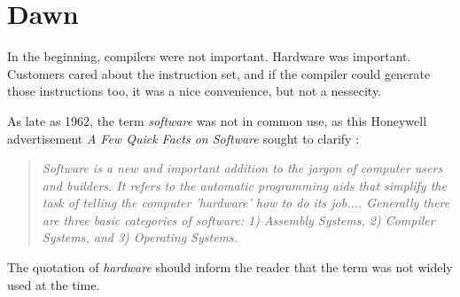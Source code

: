 \chapter{Dawn}

In the beginning, compilers were not important.
Hardware was important.
Customers cared about the instruction set,
and if the compiler could generate those instructions too,
it was a nice convenience, but not a nessecity.

As late as 1962, the term \textit{software} was not in common use, as
this Honeywell advertisement \textit{A Few Quick Facts on Software} sought to clarify \cite[ch.5]{new_history_of_modern_computing}:

\begin{quotation}
\textit{
Software is a new and important addition to the jargon of computer users and builders.
It refers to the automatic programming aids that simplify the task of telling the computer 'hardware' how to do its job....
Generally there are three basic categories of software:
1) Assembly Systems, 2) Compiler Systems, and 3) Operating Systems.
}
\end{quotation}

The quotation of \textit{hardware} should inform the reader that the term was not widely
used at the time.
